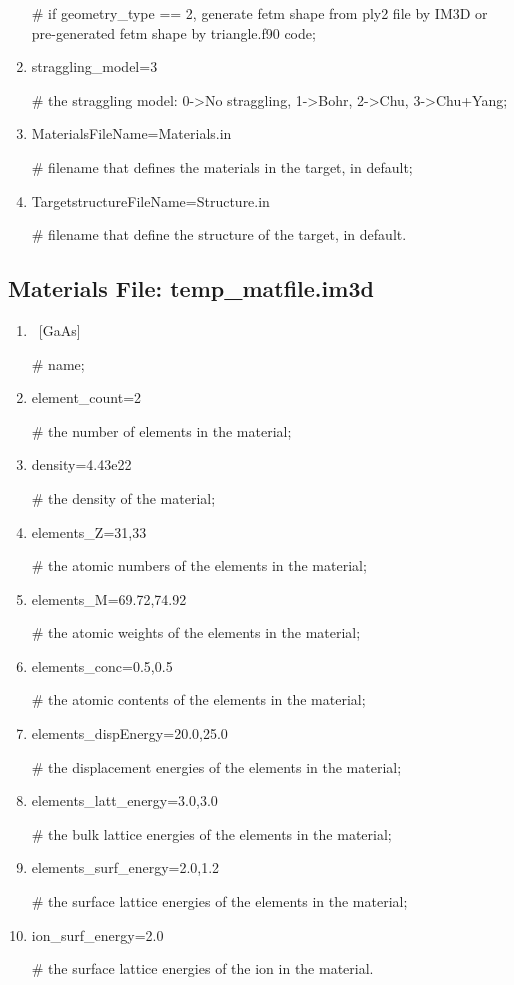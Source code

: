 \begin{enumerate}[1:~]
\# if geometry\_type == 2, generate fetm shape from ply2 file by IM3D or pre-generated fetm shape by triangle.f90 code;

\item straggling\_model=3

\# the straggling model: 0->No straggling, 1->Bohr, 2->Chu, 3->Chu+Yang;

\item MaterialsFileName=Materials.in

\# filename that defines the materials in the target, in default;

\item TargetstructureFileName=Structure.in

\# filename that define the structure of the target, in default.

\end{enumerate}

\subsection{Materials File: temp\_matfile.im3d}

\begin{enumerate}[1:~]
\item ~[GaAs]

\# name;

\item element\_count=2

\# the number of elements in the material;

\item density=4.43e22

\# the density of the material;

\item elements\_Z=31,33

\# the atomic numbers of the elements in the material;

\item elements\_M=69.72,74.92

\# the atomic weights of the elements in the material;

\item elements\_conc=0.5,0.5

\# the atomic contents of the elements in the material;

\item elements\_dispEnergy=20.0,25.0

\# the displacement energies of the elements in the material;

\item elements\_latt\_energy=3.0,3.0

\# the bulk lattice energies of the elements in the material;

\item elements\_surf\_energy=2.0,1.2

\# the surface lattice energies of the elements in the material;

\item ion\_surf\_energy=2.0

\# the surface lattice energies of the ion in the material.

\end{enumerate}

